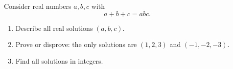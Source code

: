 Consider real numbers $a,b,c$ with
\[a+b+c=abc .\]
\begin{enumerate}
\item[(a)] Describe all real solutions $(a,b,c)$.
\item[(b)] Prove or disprove: the only solutions are $(1,2,3)$ and $(-1,-2,-3)$.
\item[(c)] Find all solutions in integers.
\end{enumerate}
